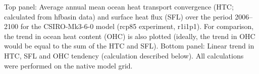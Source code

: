 \label{fig:csiro}
Top panel: Average annual mean ocean heat transport convergence (HTC; calculated from hfbasin data) and surface heat flux (SFL) over the period 2006--2100 for the CSIRO-Mk3-6-0 model (rcp85 experiment, r1i1p1). For comparison, the trend in ocean heat content (OHC) is also plotted (ideally, the trend in OHC would be equal to the sum of the HTC and SFL). Bottom panel: Linear trend in HTC, SFL and OHC tendency (calculation described below). All calculations were performed on the native model grid.